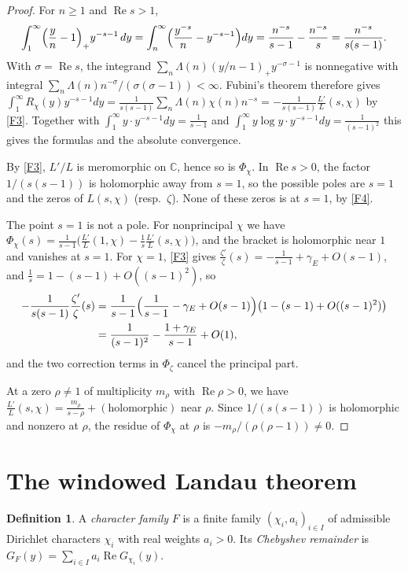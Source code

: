 \documentclass[11pt]{amsart}
\newcommand{\CC}{\mathbb{C}}
\newcommand{\re}{\operatorname{Re}}
\newcommand{\gE}{\gamma_{E}}
\theoremstyle{plain}
\theoremstyle{definition}
\newtheorem{definition}[theorem]{Definition}
\numberwithin{equation}{section}
\begin{document}
\begin{proof}
For $n\ge1$ and $\re s>1$,
\[
\int_1^\infty\Bigl(\frac yn-1\Bigr)_{+}y^{-s-1}\,dy=\int_n^\infty\Bigl(\frac{y^{-s}}{n}-y^{-s-1}\Bigr)dy
=\frac{n^{-s}}{s-1}-\frac{n^{-s}}{s}=\frac{n^{-s}}{s(s-1)}.
\]
With $\sigma=\re s$, the integrand $\sum_n\Lambda(n)(y/n-1)_+y^{-\sigma-1}$ is nonnegative with
integral $\sum_n\Lambda(n)n^{-\sigma}/(\sigma(\sigma-1))<\infty$. Fubini's theorem therefore gives
$\int_1^\infty R_\chi(y)y^{-s-1}dy=\frac{1}{s(s-1)}\sum_n\Lambda(n)\chi(n)n^{-s}
=-\frac{1}{s(s-1)}\frac{L'}{L}(s,\chi)$ by \ref{F3}. Together with
$\int_1^\infty y\cdot y^{-s-1}dy=\frac1{s-1}$ and $\int_1^\infty y\log y\cdot y^{-s-1}dy=\frac1{(s-1)^2}$
this gives the formulas and the absolute convergence.

By \ref{F3}, $L'/L$ is meromorphic on $\CC$, hence so is $\Phi_\chi$. In $\re s>0$, the factor
$1/(s(s-1))$ is holomorphic away from $s=1$, so the possible poles are $s=1$ and the zeros of
$L(s,\chi)$ (resp.\ $\zeta$). None of these zeros is at $s=1$, by \ref{F4}.

The point $s=1$ is not a pole. For nonprincipal $\chi$ we have
$\Phi_\chi(s)=\frac1{s-1}\bigl(\frac{L'}{L}(1,\chi)-\frac1s\frac{L'}{L}(s,\chi)\bigr)$, and the
bracket is holomorphic near $1$ and vanishes at $s=1$. For $\chi=1$, \ref{F3} gives
$\frac{\zeta'}{\zeta}(s)=-\frac1{s-1}+\gE+O(s-1)$, and $\frac1s=1-(s-1)+O((s-1)^2)$, so
\begin{align*}
-\frac{1}{s(s-1)}\frac{\zeta'}{\zeta}(s)&=\frac{1}{s-1}\Bigl(\frac1{s-1}-\gE+O(s-1)\Bigr)\bigl(1-(s-1)+O((s-1)^2)\bigr)\\
&=\frac{1}{(s-1)^2}-\frac{1+\gE}{s-1}+O(1),
\end{align*}
and the two correction terms in $\Phi_\zeta$ cancel the principal part.

At a zero $\rho\neq1$ of multiplicity $m_\rho$ with $\re\rho>0$, we have
$\frac{L'}{L}(s,\chi)=\frac{m_\rho}{s-\rho}+(\text{holomorphic})$ near $\rho$. Since $1/(s(s-1))$
is holomorphic and nonzero at $\rho$, the residue of $\Phi_\chi$ at $\rho$ is
$-m_\rho/(\rho(\rho-1))\neq0$.
\end{proof}
\section{The windowed Landau theorem}\label{sec:A}

\begin{definition}\label{def:family}
A \emph{character family} $F$ is a finite family $(\chi_i,a_i)_{i\in I}$ of admissible Dirichlet
characters $\chi_i$ with real weights $a_i>0$. Its \emph{Chebyshev remainder} is
$G_F(y)=\sum_{i\in I}a_i\re G_{\chi_i}(y)$.
\end{definition}
\end{document}
